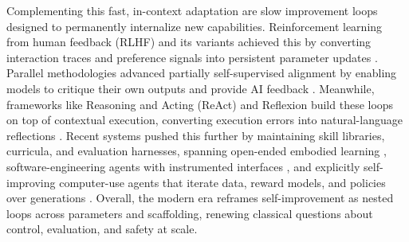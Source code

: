 Complementing this fast, in-context adaptation are slow improvement loops designed to permanently internalize new capabilities. Reinforcement learning from human feedback (RLHF) and its variants achieved this by converting interaction traces and preference signals into persistent parameter updates \citep{ouyang2022training}. Parallel methodologies advanced partially self-supervised alignment by enabling models to critique their own outputs and provide AI feedback \citep{bai2022constitutional}. Meanwhile, frameworks like Reasoning and Acting (ReAct) and Reflexion build these loops on top of contextual execution, converting execution errors into natural-language reflections \citep{yao2022react, shinn2023reflexionlanguageagentsverbal}. Recent systems  pushed this further by maintaining skill libraries, curricula, and evaluation harnesses, spanning open-ended embodied learning \citep{wang2023voyageropenendedembodiedagent}, software-engineering agents with instrumented interfaces \citep{yang2024sweagentagentcomputerinterfacesenable, zhang2025darwingodelmachineopenended, wang2025huxleygodelmachinehumanlevelcoding}, and explicitly self-improving computer-use agents that iterate data, reward models, and policies over generations \citep{xiao2025uigenie, sun2025seagentselfevolvingcomputeruse}. Overall, the modern era reframes self-improvement as nested loops across parameters and scaffolding, renewing classical questions about control, evaluation, and safety at scale.
